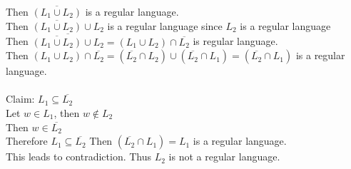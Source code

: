 \documentclass{article}
\begin{document}
\begin{enumerate}
    Then $\overline{(L_1\cup L_2)}$ is a regular language.\\
    Then $\overline{(L_1\cup L_2)} \cup L_2$ is a regular language since $L_2$ is a regular language\\
    Then $\overline{\overline{(L_1\cup L_2)} \cup L_2} = (L_1 \cup L_2) \cap \overline{L_2}$ is regular language.\\
    Then $(L_1 \cup L_2) \cap \overline{L_2}= (\overline{L_2} \cap L_2) \cup (\overline{L_2} \cap L_1) = (\overline{L_2} \cap L_1) $ is a regular language.\\\\
    Claim: $L_1 \subseteq \overline{L_2}$\\
    Let $w \in L_1$, then $w \notin L_2$\\
    Then $w \in \overline{L_2}$\\
    Therefore $L_1 \subseteq \overline{L_2}$
    Then $(\overline{L_2} \cap L_1) = L_1$ is a regular language.\\
    This leads to contradiction.
    Thus $L_2$ is not a regular language.





\end{enumerate}
\end{document}
